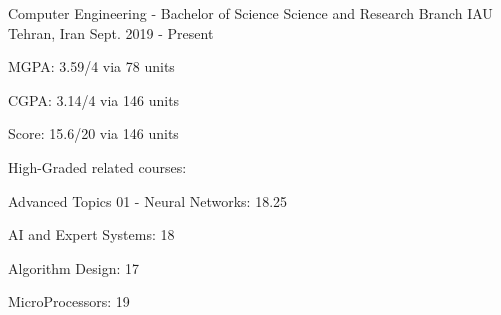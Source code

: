 


\begin{cventries}

\cventry
{Computer Engineering - Bachelor of Science}
{Science and Research Branch IAU}
{Tehran, Iran}
{Sept. 2019 - Present}
{ %
\begin{cvitems}
\item {\vspace{-4.0mm}\fontsize{11}{12}\selectfont MGPA: 3.59/4 via 78 units}
\item {\fontsize{11}{12}\selectfont CGPA: 3.14/4 via 146 units}
\item {\fontsize{11}{12}\selectfont Score: 15.6/20 via 146 units}
\item {\fontsize{11}{12}\selectfont High-Graded related courses:}
\begin{cvitems}
\item {\fontsize{9}{10}\selectfont Advanced Topics 01 - Neural Networks: 18.25}
\item {\fontsize{9}{10}\selectfont AI and Expert Systems: 18}
\item {\fontsize{9}{10}\selectfont Algorithm Design: 17}
\item {\fontsize{9}{10}\selectfont MicroProcessors: 19}
\end{cvitems}
\end{cvitems}
}


\end{cventries}
